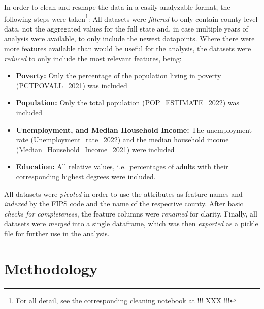 In order to clean and reshape the data in a easily analyzable format, the following steps were taken\footnote{For all detail, see the corresponding cleaning notebook at !!! XXX !!!}:
All datasets were \textit{filtered} to only contain county-level data, not the aggregated values for the full state and, in case multiple years of analysis were available, to only include the newest datapoints. 
Where there were more features available than would be useful for the analysis, the datasets were \textit{reduced} to only include the most relevant features, being:

\begin{itemize}
    \item \textbf{Poverty:} Only the percentage of the population living in poverty (PCTPOVALL\_2021) was included
    \item \textbf{Population:} Only the total population (POP\_ESTIMATE\_2022) was included
    \item \textbf{Unemployment, and Median Household Income:} The unemployment rate (Unemployment\_rate\_2022) and the median household income (Median\_Household\_Income\_2021) were included
    \item \textbf{Education:} All relative values, i.e.\ percentages of adults with their corresponding highest degrees were included.
\end{itemize}

All datasets were \textit{pivoted} in order to use the attributes as feature names and \textit{indexed} by the FIPS code and the name of the respective county. After basic \textit{checks for completeness}, the feature columns were \textit{renamed} for clarity. Finally, all datasets were \textit{merged} into a single dataframe, which was then \textit{exported} as a pickle file for further use in the analysis.

\section{Methodology}\label{sec:Methodology}